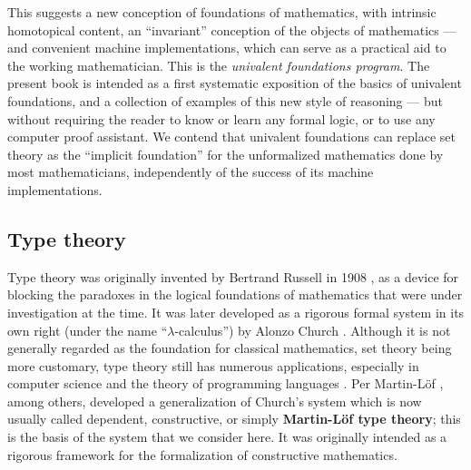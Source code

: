 This suggests a new conception of foundations of mathematics, with intrinsic homotopical content, an ``invariant'' conception of the objects of mathematics --- and convenient machine implementations, which can serve as a practical aid to the working mathematician.
This is the \emph{univalent foundations program}.
The present book is intended as a first systematic exposition of the basics of univalent foundations, and a collection of examples of this new style of reasoning --- but without requiring the reader to know or learn any formal logic, or to use any computer proof assistant.
We contend that univalent foundations can replace set theory as the ``implicit foundation'' for the unformalized mathematics done by most mathematicians, independently of the success of its machine implementations.


\subsection*{Type theory}

Type theory was originally invented by Bertrand Russell in 1908 \cite{Russell:1908}, as a device for blocking the paradoxes in the logical foundations of mathematics  that were under investigation at the time. It was later developed as a rigorous formal system  in its own right (under the name ``$\lambda$-calculus'') by Alonzo Church \cite{Church:1933cl,Church:1940tu,Church:1941tc}.  Although it is not generally regarded as the foundation for classical mathematics, set theory being more customary, type theory still has numerous applications, especially in computer science and the theory of programming languages \cite{Pierce:2002tp}.   Per Martin-L\"{o}f \cite{MartinLof:1998tw,MartinLof:1975tb,MartinLof:1982bn,MartinLof:1984tr}, among others,
developed a generalization of Church's system which is now usually called dependent, constructive, or simply {\bf Martin\--L\"of type theory}; this is the basis of the system that we consider here. It was originally intended as a rigorous framework for the formalization of constructive mathematics.  


